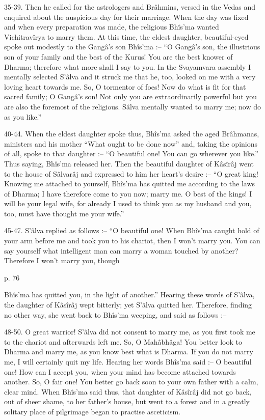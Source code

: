  

35-39. Then he called for the astrologers and Brâhmins, versed in the Vedas and enquired about the auspicious day for their marriage. When the day was fixed and when every preparation was made, the religious Bhîs’ma wanted Vichitravîrya to marry them. At this time, the eldest daughter, beautiful-eyed spoke out modestly to the Gangâ's son Bhîs’ma :-- “O Gangâ's son, the illustrious son of your family and the best of the Kurus! You are the best knower of Dharma; therefore what more shall I say to you. In the Svayamvara assembly I mentally selected S'âlva and it struck me that he, too, looked on me with a very loving heart towards me. So, O tormentor of foes! Now do what is fit for that sacred family; O Gangâ's son! Not only you are extraordinarily powerful but you are also the foremost of the religious. Sâlva mentally wanted to marry me; now do as you like.”

 

40-44. When the eldest daughter spoke thus, Bhîs’ma asked the aged Brâhmanas, ministers and his mother “What ought to be done now” and, taking the opinions of all, spoke to that daughter :-- “O beautiful one! You can go wherever you like.” Thus saying, Bhîs’ma released her. Then the beautiful daughter of Kâsîrâj went to the house of Sâlvarâj and expressed to him her heart's desire :-- “O great king! Knowing me attached to yourself, Bhîs’ma has quitted me according to the laws of Dharma; I have therefore come to you now; marry me. O best of the kings! I will be your legal wife, for already I used to think you as my husband and you, too, must have thought me your wife.”

 

45-47. S'âlva replied as follows :-- “O beautiful one! When Bhîs’ma caught hold of your arm before me and took you to his chariot, then I won't marry you. You can say yourself what intelligent man can marry a woman touched by another? Therefore I won't marry you, though

 

p. 76

 

Bhîs’ma has quitted you, in the light of another.” Hearing these words of S’âlva, the daughter of Kâsîrâj wept bitterly; yet S’âlva quitted her. Therefore, finding no other way, she went back to Bhîs’ma weeping, and said as follows :--

 

48-50. O great warrior! S’âlva did not consent to marry me, as you first took me to the chariot and afterwards left me. So, O Mahâbhâga! You better look to Dharma and marry me, as you know best what is Dharma. If you do not marry me, I will certainly quit my life. Hearing her words Bhîs’ma said :-- O beautiful one! How can I accept you, when your mind has become attached towards another. So, O fair one! You better go back soon to your own father with a calm, clear mind. When Bhîs’ma said thus, that daughter of Kâsîrâj did not go back, out of sheer shame, to her father's house, but went to a forest and in a greatly solitary place of pilgrimage began to practise asceticism.

